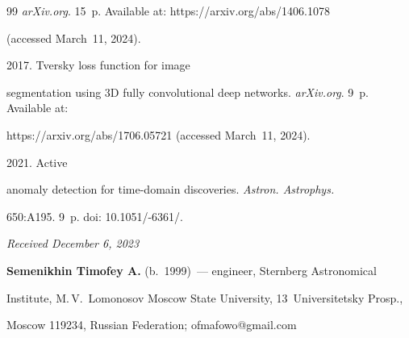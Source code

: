 {{\begin{thebibliography}{99}
\textit{arXiv.org}. 15~p. Available at: {\sf https://arxiv.org/abs/1406.1078} 

(accessed March~11, 2024).





 2017. Tversky loss function for image 

segmentation using 3D fully convolutional deep networks. \textit{arXiv.org}. 9~p. Available at: 

{\sf https://arxiv.org/abs/1706.05721} (accessed March~11, 2024).





 2021. Active 

anomaly detection for time-domain discoveries. \textit{Astron. Astrophys.} 

650:A195. 9~p. doi: 10.1051\!/-6361\!/.



\end{thebibliography} } }







\vspace*{-6pt}



\hfill{\small\textit{Received December 6, 2023}}



\vspace*{-6pt}





\Contrl



\noindent

\textbf{Semenikhin Timofey A.} (b.\ 1999)~--- engineer, Sternberg Astronomical 

Institute, M.\,V.~Lomonosov Moscow State University, 13~Universitetsky Prosp., 

Moscow 119234, Russian Federation; \mbox{ofmafowo@gmail.com}













